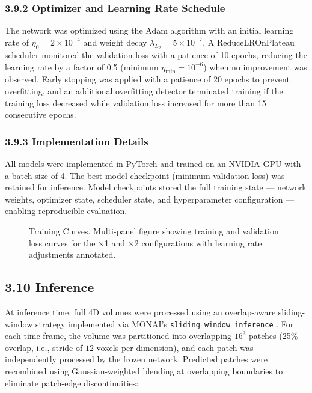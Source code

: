 \subsubsection*{3.9.2 Optimizer and Learning Rate Schedule}

The network was optimized using the Adam algorithm \cite{kingma2015adam} with an initial learning rate of $\eta_0 = 2\times10^{-4}$ and weight decay $\lambda_{L_2} = 5\times10^{-7}$. A ReduceLROnPlateau scheduler monitored the validation loss with a patience of 10 epochs, reducing the learning rate by a factor of 0.5 (minimum $\eta_{\min} = 10^{-6}$) when no improvement was observed. Early stopping was applied with a patience of 20 epochs to prevent overfitting, and an additional overfitting detector terminated training if the training loss decreased while validation loss increased for more than 15 consecutive epochs.

\subsubsection*{3.9.3 Implementation Details}

All models were implemented in PyTorch and trained on an NVIDIA GPU with a batch size of 4. The best model checkpoint (minimum validation loss) was retained for inference. Model checkpoints stored the full training state --- network weights, optimizer state, scheduler state, and hyperparameter configuration --- enabling reproducible evaluation.

\begin{figure}[h]
    \centering
    \caption{Training Curves. Multi-panel figure showing training and validation loss curves for the $\times$1 and $\times$2 configurations with learning rate adjustments annotated.}
    \label{fig:training}
\end{figure}

\subsection*{3.10 Inference}

At inference time, full 4D volumes were processed using an overlap-aware sliding-window strategy implemented via MONAI's \texttt{sliding\_window\_inference} \cite{cardoso2022monai,ronneberger2015unet}. For each time frame, the volume was partitioned into overlapping $16^3$ patches (25\% overlap, i.e., stride of $12$ voxels per dimension), and each patch was independently processed by the frozen network. Predicted patches were recombined using Gaussian-weighted blending at overlapping boundaries to eliminate patch-edge discontinuities:

